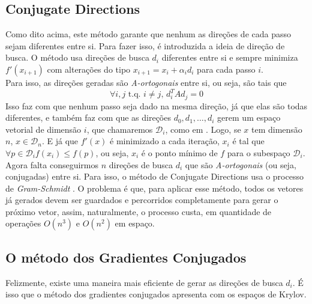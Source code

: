 \documentclass[
10pt, %
a4paper, %
oneside, %
headinclude,footinclude, %
BCOR5mm, %
]{scrartcl}
\begin{document}
\subsection{Conjugate Directions}
Como dito acima, este método garante que nenhum as direções de cada passo sejam diferentes entre si. Para fazer isso, é introduzida a ideia de direção de busca. O método usa direções de busca $d_i$ diferentes entre si e sempre minimiza $f'(x_{i+1})$ com alterações do tipo $x_{i+1} = x_i + \alpha_i d_i$ para cada passo $i$. \\
Para isso, as direções geradas são \textit{A-ortogonais} entre si, ou seja, são tais que 
$$ \forall i,j \text{ t.q. } i \neq j\text{, } d_i^{T}Ad_j = 0 $$
Isso faz com que nenhum passo seja dado na mesma direção, já que elas são todas diferentes, e também faz com que as direções $d_0, d_1, \dots, d_i$ gerem um espaço vetorial de dimensão $i$, que chamaremos $\mathcal{D}_i$, como em \cite{shewchuk1994introduction}. Logo, se $x$ tem dimensão $n$, $x \in \mathcal{D}_n$. E já que $f'(x)$ é minimizado a cada iteração, $x_i$ é tal que $\forall p \in \mathcal{D}_i f(x_i) \leq f(p)$, ou seja, $x_i$ é o ponto mínimo de $f$ para o subespaço $\mathcal{D}_i$. \\
Agora falta conseguirmos $n$ direções de busca ${d_i}$ que são \textit{A-ortogonais} (ou seja, conjugadas) entre si. Para isso, o método de Conjugate Directions usa o processo de \textit{Gram-Schmidt} \cite[p.~25]{shewchuck1994introduction}. O problema é que, para aplicar esse método, todos os vetores já gerados devem ser guardados e percorridos completamente para gerar o próximo vetor, assim, naturalmente, o processo custa, em quantidade de operações $O(n^3)$ e $O(n^2)$ em espaço. \\

\subsection{O método dos Gradientes Conjugados}
Felizmente, existe uma maneira mais eficiente de gerar as direções de busca ${d_i}$. É isso que o método dos gradientes conjugados apresenta com os espaços de Krylov. 




\renewcommand{\refname}{\spacedlowsmallcaps{Bibliografia}} %

\end{document}
